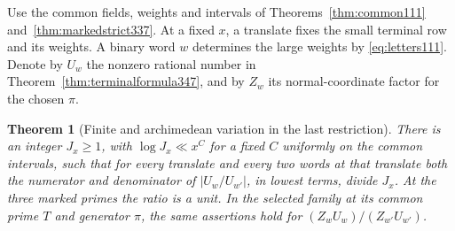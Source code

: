 \documentclass[a4paper,11pt]{article}
\newtheorem{theorem}[proposition]{Theorem}
\theoremstyle{definition}
\theoremstyle{remark}
\numberwithin{equation}{section}
\begin{document}
Use the common fields, weights and intervals of
Theorems~\ref{thm:common111} and~\ref{thm:markedstrict337}.
At a fixed \(x\), a translate fixes the small terminal row and
its weights. A binary word \(w\) determines the large weights
by \eqref{eq:letters111}. Denote by \(U_w\) the nonzero rational
number in Theorem~\ref{thm:terminalformula347}, and by
\(Z_w\) its normal-coordinate factor for the chosen \(\pi\).

\begin{theorem}[Finite and archimedean variation in the last restriction]\leavevmode
\label{thm:wordlower348}
There is an integer \(J_x\ge1\), with \(\log J_x\ll x^C\)
for a fixed \(C\) uniformly on the common intervals, such that
for every translate and every two words at that translate both
the numerator and denominator of \(|U_w/U_{w'}|\), in lowest
terms, divide \(J_x\). At the three marked primes the ratio is
a unit. In the selected family at its common prime \(T\) and
generator \(\pi\), the same assertions hold for
\((Z_wU_w)/(Z_{w'}U_{w'})\).
\end{theorem}
\end{document}
